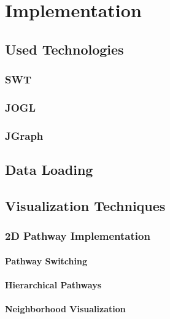 \chapter{Implementation}

\section{Used Technologies}
\subsection{SWT}


\subsection{JOGL}


\subsection{JGraph}

\section{Data Loading}

\section{Visualization Techniques}

\subsection{2D Pathway Implementation}
\subsubsection{Pathway Switching}
\subsubsection{Hierarchical Pathways}
\subsubsection{Neighborhood Visualization}


